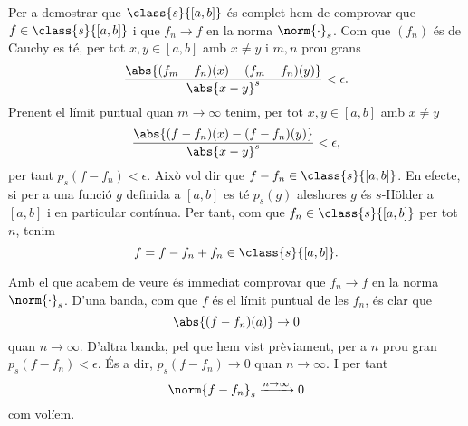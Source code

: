 \documentclass[12pt]{article}
\begin{document}
Per a demostrar que \( \class{s}{[a,b]} \) és complet hem de comprovar que \( f \in
\class{s}{[a,b]} \) i que \( f_n \to f \) en la norma \( \norm{\cdot}_s \). Com que \(
(f_n) \) és de Cauchy es té, per tot \( x, y \in [a,b] \) amb \( x \neq y \) i \( m,n \)
prou grans
\begin{equation*}
	\frac{\abs{(f_m - f_n)(x) - (f_m - f_n)(y)}}{\abs{x - y}^s} < \epsilon.
\end{equation*}
Prenent el límit puntual quan \( m \to \infty \) tenim, per tot \( x,y \in [a,b] \) amb \(
x \neq y \)
\begin{equation*}
	\frac{\abs{(f - f_n)(x) - (f - f_n)(y)}}{\abs{x - y}^s} < \epsilon,
\end{equation*}
per tant \( p_s(f - f_n) < \epsilon \). Això vol dir que \( f - f_n \in \class{s}{[a,b]}
\). En efecte, si per a una funció \( g \) definida a \( [a,b] \) es té \( p_s(g) \)
aleshores \( g \) és \( s \)-Hölder a \( [a,b] \) i en particular contínua. Per tant, com
que \( f_n \in \class{s}{[a,b]} \) per tot \( n \), tenim
\begin{equation*}
	f = f - f_n + f_n \in \class{s}{[a,b]}.
\end{equation*}

Amb el que acabem de veure és immediat comprovar que \( f_n \to f \) en la norma \(
\norm{\cdot}_s \). D'una banda, com que \( f \) és el límit puntual de les \( f_n \), és
clar que 
\begin{equation*}
	\abs{(f - f_n)(a)} \to 0
\end{equation*}
quan \( n \to \infty \). D'altra banda, pel que hem vist prèviament, per a \( n \) prou
gran \( p_s(f - f_n) < \epsilon \). És a dir, \( p_s(f - f_n) \to 0 \) quan \( n \to
\infty \). I per tant
\begin{equation*}
	\norm{f - f_n}_s \xrightarrow{n \to \infty} 0
\end{equation*}
com volíem.
\end{document}
